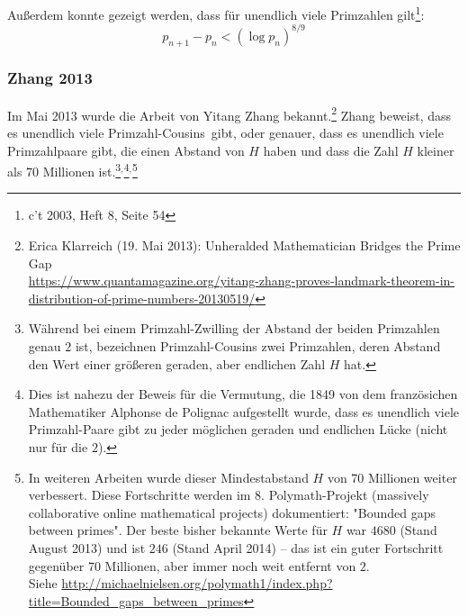 \begin{refsegment}
Außerdem konnte gezeigt werden, dass für unendlich viele Primzahlen
gilt\footnote{ c't 2003, Heft 8, Seite 54}: \[p_{n+1}-p_n < (\log{p_n})^{8/9}\]



\subsubsection{Zhang 2013}

Im Mai 2013 wurde die Arbeit von Yitang Zhang
bekannt.\footnote{%
   Erica Klarreich (19. Mai 2013): \glqq Unheralded Mathematician Bridges the
   Prime Gap\grqq \\
   \url{https://www.quantamagazine.org/yitang-zhang-proves-landmark-theorem-in-distribution-of-prime-numbers-20130519/}}
Zhang beweist, dass es unendlich viele \glqq Primzahl-Cousins\grqq~gibt, oder
genauer, dass es unendlich viele Primzahlpaare gibt, die einen Abstand von $H$
haben und dass die Zahl $H$ kleiner als 70 Millionen ist.\footnote{%
Während bei einem Primzahl-Zwilling der Abstand der beiden Primzahlen genau
$2$ ist, bezeichnen Primzahl-Cousins zwei Primzahlen,
deren Abstand den Wert einer größeren geraden, aber endlichen Zahl $H$ hat.
      }${}^,$\footnote{%
Dies ist nahezu der Beweis für die Vermutung, die 1849 von dem französichen
Mathematiker Alphonse de Polignac aufgestellt wurde, dass es unendlich viele
Primzahl-Paare gibt zu jeder möglichen geraden und endlichen Lücke (nicht nur
für die $2$).
       }${}^,$\footnote{%
In weiteren Arbeiten wurde dieser Mindestabstand $H$ von 70 Millionen
weiter verbessert. Diese Fortschritte werden im 8. Polymath-Projekt
(massively collaborative online mathematical projects) dokumentiert: "Bounded
gaps between primes". Der beste bisher bekannte Werte für $H$ war $4680$ (Stand
August 2013) und ist $246$ (Stand April 2014) -- das ist ein guter Fortschritt
gegenüber 70 Millionen, aber immer noch weit entfernt von $2$.\\
Siehe \url{http://michaelnielsen.org/polymath1/index.php?title=Bounded_gaps_between_primes}
   }


\end{refsegment}

